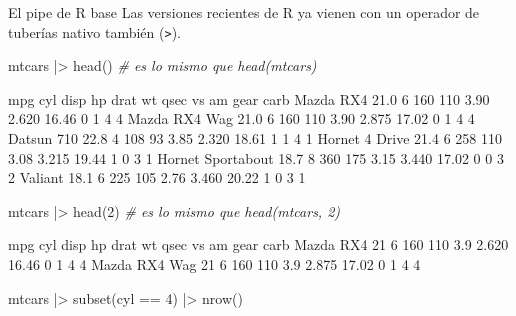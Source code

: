 \documentclass[
  ignorenonframetext,
  aspectratio=169]{beamer}
\newenvironment{Shaded}{\begin{snugshade}}{\end{snugshade}}
\newcommand{\CommentTok}[1]{\textcolor[rgb]{0.56,0.35,0.01}{\textit{#1}}}
\newcommand{\DecValTok}[1]{\textcolor[rgb]{0.00,0.00,0.81}{#1}}
\newcommand{\FunctionTok}[1]{\textcolor[rgb]{0.00,0.00,0.00}{#1}}
\newcommand{\NormalTok}[1]{#1}
\newcommand{\SpecialCharTok}[1]{\textcolor[rgb]{0.00,0.00,0.00}{#1}}
\let\oldverbatim\verbatim
\let\endoldverbatim\endverbatim
\renewenvironment{verbatim}{\tiny\oldverbatim}{\endoldverbatim}
\begin{document}
\begin{frame}[fragile]{El pipe de R base}
\protect\hypertarget{el-pipe-de-r-base}{}
Las versiones recientes de R ya vienen con un operador de tuberías
nativo también (\texttt{\textbar{}\textgreater{}}).

\begin{Shaded}
\begin{Highlighting}[]
\NormalTok{mtcars }\SpecialCharTok{|\textgreater{}} \FunctionTok{head}\NormalTok{()  }\CommentTok{\#  es lo mismo que head(mtcars)}
\end{Highlighting}
\end{Shaded}

\begin{verbatim}
                   mpg cyl disp  hp drat    wt  qsec vs am gear carb
Mazda RX4         21.0   6  160 110 3.90 2.620 16.46  0  1    4    4
Mazda RX4 Wag     21.0   6  160 110 3.90 2.875 17.02  0  1    4    4
Datsun 710        22.8   4  108  93 3.85 2.320 18.61  1  1    4    1
Hornet 4 Drive    21.4   6  258 110 3.08 3.215 19.44  1  0    3    1
Hornet Sportabout 18.7   8  360 175 3.15 3.440 17.02  0  0    3    2
Valiant           18.1   6  225 105 2.76 3.460 20.22  1  0    3    1
\end{verbatim}

\begin{Shaded}
\begin{Highlighting}[]
\NormalTok{mtcars }\SpecialCharTok{|\textgreater{}} \FunctionTok{head}\NormalTok{(}\DecValTok{2}\NormalTok{) }\CommentTok{\#  es lo mismo que  head(mtcars, 2)}
\end{Highlighting}
\end{Shaded}

\begin{verbatim}
              mpg cyl disp  hp drat    wt  qsec vs am gear carb
Mazda RX4      21   6  160 110  3.9 2.620 16.46  0  1    4    4
Mazda RX4 Wag  21   6  160 110  3.9 2.875 17.02  0  1    4    4
\end{verbatim}

\begin{Shaded}
\begin{Highlighting}[]
\NormalTok{mtcars }\SpecialCharTok{|\textgreater{}} \FunctionTok{subset}\NormalTok{(cyl }\SpecialCharTok{==} \DecValTok{4}\NormalTok{) }\SpecialCharTok{|\textgreater{}} \FunctionTok{nrow}\NormalTok{()  }
\end{Highlighting}
\end{Shaded}

\begin{verbatim}
[1] 11
\end{verbatim}
\end{frame}
\end{document}
